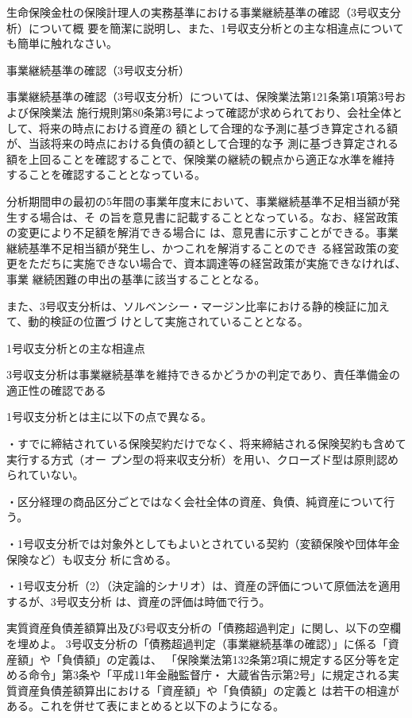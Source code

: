 \documentclass[report,gutter=10mm,fore-edge=10mm,uplatex,dvipdfmx]{jlreq}
\begin{document}
生命保険金杜の保険計理人の実務基準における事業継続基準の確認（3号収支分析）について概
要を簡潔に説明し、また、1号収支分析との主な相違点についても簡単に触れなさい。

\answer{}
事業継続基準の確認（3号収支分析）

事業継続基準の確認（3号収支分析）については、保険業法第121条第1項第3号および保険業法
施行規則第80条第3号によって確認が求められており、会社全体として、将来の時点における資産の
額として合理的な予測に基づき算定される額が、当該将来の時点における負債の額として合理的な予
測に基づき算定される額を上回ることを確認することで、保険業の継続の観点から適正な水準を維持
することを確認することとなっている。

分析期間申の最初の5年間の事業年度末において、事業継続基準不足相当額が発生する場合は、そ
の旨を意見書に記載することとなっている。なお、経営政策の変更により不足額を解消できる場合に
は、意見書に示すことができる。事業継続基準不足相当額が発生し、かつこれを解消することのでき
る経営政策の変更をただちに実施できない場合で、資本調達等の経営政策が実施できなければ、事業
継続困難の申出の基準に該当することとなる。

また、3号収支分析は、ソルベンシー・マージン比率における静的検証に加えて、動的検証の位置づ
けとして実施されていることとなる。

1号収支分析との主な相違点

3号収支分析は事業継続基準を維持できるかどうかの判定であり、責任準備金の適正性の確認である

1号収支分析とは主に以下の点で異なる。

・すでに締結されている保険契約だけでなく、将来締結される保険契約も含めて実行する方式（オー
プン型の将来収支分析）を用い、クローズド型は原則認められていない。

・区分経理の商品区分ごとではなく会社全体の資産、負債、純資産について行う。

・1号収支分析では対象外としてもよいとされている契約（変額保険や団体年金保険など）も収支分
析に含める。

・1号収支分析（2）（決定論的シナリオ）は、資産の評価について原価法を適用するが、3号収支分析
は、資産の評価は時価で行う。


実質資産負債差額算出及び3号収支分析の「債務超過判定」に関し、以下の空欄を埋めよ。
3号収支分析の「債務超過判定（事業継続基準の確認）」に係る「資産額」や「負債額」の定義は、
「保険業法第132条第2項に規定する区分等を定める命令」第3条や「平成11年金融監督庁・
大蔵省告示第2号」に規定される実質資産負債差額算出における「資産額」や「負債額」の定義と
は若干の相違がある。これを併せて表にまとめると以下のようになる。
\end{document}

